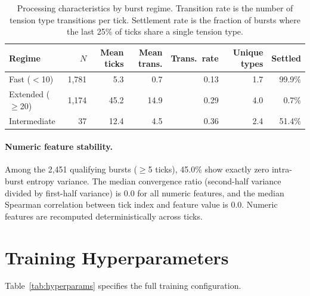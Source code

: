 \documentclass[twoside,11pt]{article}
\begin{document}
\begin{table}[h]
\caption{Processing characteristics by burst regime. Transition rate is the
number of tension type transitions per tick. Settlement rate is the fraction
of bursts where the last 25\% of ticks share a single tension type.}
\label{tab:regime-details}
\centering
\small
\begin{tabular}{@{}lrrrrrr@{}}
\toprule
Regime & $N$ & Mean ticks & Mean trans. & Trans.\ rate & Unique types & Settled \\
\midrule
Fast ($<$10)    & 1,781 & 5.3 & 0.7 & 0.13 & 1.7 & 99.9\% \\
Extended ($\geq$20) & 1,174 & 45.2 & 14.9 & 0.29 & 4.0 & 0.7\% \\
Intermediate    & 37 & 12.4 & 4.5 & 0.36 & 2.4 & 51.4\% \\
\bottomrule
\end{tabular}
\end{table}

\paragraph{Numeric feature stability.} Among the 2,451 qualifying bursts
($\geq$5 ticks), 45.0\% show exactly zero intra-burst entropy variance. The
median convergence ratio (second-half variance divided by first-half variance)
is 0.0 for all numeric features, and the median Spearman correlation between
tick index and feature value is 0.0. Numeric features are recomputed
deterministically across ticks.


\section{Training Hyperparameters}
\label{app:hyperparams}

Table~\ref{tab:hyperparams} specifies the full training configuration.
\end{document}

